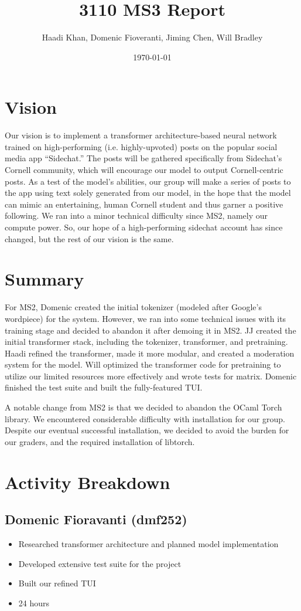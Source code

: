\documentclass[11pt]{article}
\author{Haadi Khan, Domenic Fioveranti, Jiming Chen, Will Bradley}
\date{\today}
\title{3110 MS3 Report}
\begin{document}
\maketitle
\section{Vision}
\label{sec:org45aef29}
Our vision is to implement a transformer architecture-based neural network trained on high-performing (i.e. highly-upvoted) posts on the popular social media app “Sidechat.” The posts will be gathered specifically from Sidechat’s Cornell community, which will encourage our model to output Cornell-centric posts. As a test of the model’s abilities, our group will make a series of posts to the app using text solely generated from our model, in the hope that the model can mimic an entertaining, human Cornell student and thus garner a positive following. We ran into a minor technical difficulty since MS2, namely our compute power. So, our hope of a high-performing sidechat account has since changed, but the rest of our vision is the same.
\section{Summary}
\label{sec:org94c1f6a}
For MS2, Domenic created the initial tokenizer (modeled after Google's wordpiece) for the system. However, we ran into some technical issues with its training stage and decided to abandon it after demoing it in MS2. JJ created the initial transformer stack, including the tokenizer, transformer, and pretraining. Haadi refined the transformer, made it more modular, and created a moderation system for the model. Will optimized the transformer code for pretraining to utilize our limited resources more effectively and wrote tests for matrix. Domenic finished the test suite and built the fully-featured TUI.

A notable change from MS2 is that we decided to abandon the OCaml Torch library. We encountered considerable difficulty with installation for our group. Despite our eventual successful installation, we decided to avoid the burden for our graders, and the required installation of libtorch.
\section{Activity Breakdown}
\label{sec:orgcfd1bb0}
\subsection{Domenic Fioravanti (dmf252)}
\label{sec:orgf8d260c}
\begin{itemize}
\item Researched transformer architecture and planned model implementation
\item Developed extensive test suite for the project
\item Built our refined TUI
\item 24 hours
\end{itemize}
\end{document}
